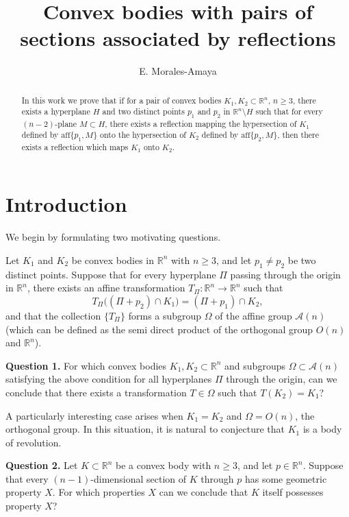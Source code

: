 \documentclass[12pt]{article}
\title{Convex bodies with pairs of sections associated by reflections}
\author{E. Morales-Amaya}
\date{}
\begin{document}
	
	\maketitle
	
	\begin{abstract}
		In this work we prove that if for a pair of convex bodies $K_1, K_2 \subset \mathbb{R}^n$, $n \geq 3$, there exists a hyperplane $H$ and two distinct points $p_1$ and $p_2$ in $\mathbb{R}^n \setminus H$ such that for every $(n-2)$-plane $M \subset H$, there exists a reflection mapping the hypersection of $K_1$ defined by $\mathrm{aff}\{p_1, M\}$ onto the hypersection of $K_2$ defined by $\mathrm{aff}\{p_2, M\}$, then there exists a reflection which maps $K_1$ onto $K_2$.
	\end{abstract}
	
\section{Introduction}

We begin by formulating two motivating questions.

Let $K_1$ and $K_2$ be convex bodies in $\mathbb{R}^n$ with $n \geq 3$, and let $p_1 \neq p_2$ be two distinct points. Suppose that for every hyperplane $\Pi$ passing through the origin in $\mathbb{R}^n$, there exists an affine transformation $T_\Pi : \mathbb{R}^n \to \mathbb{R}^n$ such that
\begin{equation}
	T_\Pi\big((\Pi + p_2) \cap K_1\big) = (\Pi + p_1) \cap K_2,
\end{equation}
and that the collection $\{T_\Pi\}$ forms a subgroup $\Omega$ of the affine group $\mathcal{A}(n)$ (which can be defined as the semi direct product of the orthogonal group $O(n)$ and $\mathbb{R}^n$).

\textbf{Question 1.} For which convex bodies $K_1, K_2 \subset \mathbb{R}^n$ and subgroups $\Omega \subset \mathcal{A}(n)$ satisfying the above condition for all hyperplanes $\Pi$ through the origin, can we conclude that there exists a transformation $T \in \Omega$ such that $T(K_2) = K_1$?

A particularly interesting case arises when $K_1 = K_2$ and $\Omega = O(n)$, the orthogonal group. In this situation, it is natural to conjecture that $K_1$ is a body of revolution.

\textbf{Question 2.} Let $K \subset \mathbb{R}^n$ be a convex body with $n \geq 3$, and let $p \in \mathbb{R}^n$. Suppose that every $(n-1)$-dimensional section of $K$ through $p$ has some geometric property $X$. For which properties $X$ can we conclude that $K$ itself possesses property $X$?
\end{document}
